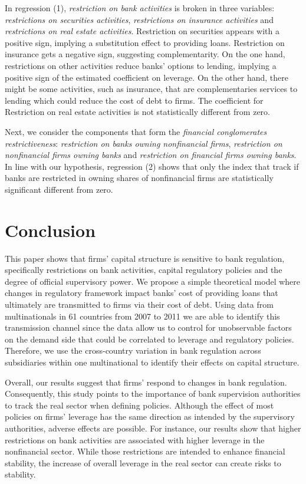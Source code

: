 \documentclass[12pt]{article}
\begin{document}
In regression (1), \textit{restriction on bank activities} is broken in three variables: \textit{restrictions on securities activities}, \textit{restrictions on insurance activities} and \textit{restrictions on real estate activities}. Restriction on securities appears with a positive sign, implying a substitution effect to providing loans. Restriction on insurance gets a negative sign, suggesting complementarity. On the one hand, restrictions on other activities reduce banks' options to lending, implying a positive sign of the estimated coefficient on leverage. On the other hand, there might be some activities, such as insurance, that are complementaries services to lending which could reduce the cost of debt to firms. The coefficient for Restriction on real estate activities is not statistically different from zero.

Next, we consider the components that form the \textit{financial conglomerates restrictiveness}: \textit{restriction on banks owning nonfinancial firms}, \textit{restriction on nonfinancial firms owning banks} and \textit{restriction on financial firms owning banks}. In line with our hypothesis, regression (2) shows that only the index that track if banks are restricted in owning shares of nonfinancial firms are statistically significant different from zero.

    	
	\section{Conclusion} \label{sec:conclusion}
		
	This paper shows that firms' capital structure is sensitive to bank regulation, specifically restrictions on bank activities, capital regulatory policies and the degree of official supervisory power. We propose a simple theoretical model where changes in regulatory framework impact banks' cost of providing loans that ultimately are transmitted to firms via their cost of debt. Using data from multinationals in 61 countries from 2007 to 2011 we are able to identify this transmission channel since the data allow us to control for unobservable factors on the demand side that could be correlated to leverage and regulatory policies. Therefore, we use the cross-country variation in bank regulation across subsidiaries within one multinational to identify their effects on capital structure.
	
	Overall, our results suggest that firms' respond to changes in bank regulation. Consequently, this study points to the importance of bank supervision authorities to track the real sector when defining policies. Although the effect of most policies on firms' leverage has the same direction as intended by the supervisory authorities, adverse effects are possible. For instance, our results show that higher restrictions on bank activities are associated with higher leverage in the nonfinancial sector. While those restrictions are intended to enhance financial stability, the increase of overall leverage in the real sector can create risks to stability.
	
\end{document}
